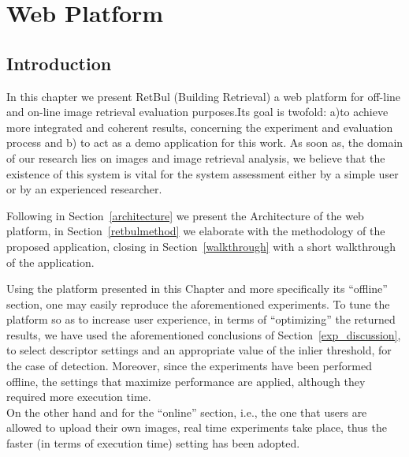\chapter{Web Platform}\label{web}
\section{Introduction}

In this chapter we present RetBul (Building Retrieval) a web platform for off-line and on-line image retrieval evaluation purposes.Its goal is twofold: a)to achieve more integrated and coherent results, concerning the experiment and evaluation process and b) to act as a demo application for this work. As soon as, the domain of our research lies on images and image retrieval analysis, we believe that the existence of this system is vital for the system assessment either by a simple user or by an experienced researcher.

Following in Section~\ref{architecture} we present the Architecture of the web platform, in Section~\ref{retbulmethod} we elaborate with the methodology of the proposed application, closing in Section~\ref{walkthrough} with a short walkthrough of the application.

Using the platform presented in this Chapter and more specifically its ``offline'' section, one may easily reproduce the aforementioned experiments.
To tune the platform so as to increase user experience, in terms of ``optimizing'' the returned results, we have used the aforementioned conclusions of Section~\ref{exp_discussion}, to select descriptor settings and an appropriate value of the inlier threshold, for the case of detection.
Moreover, since the experiments have been performed offline, the settings that maximize performance are applied, although they required more execution time.\\
On the other hand and for the ``online'' section, i.e., the one that users are allowed to upload their own images, real time experiments take place, thus the faster (in terms of execution time) setting has been adopted.

